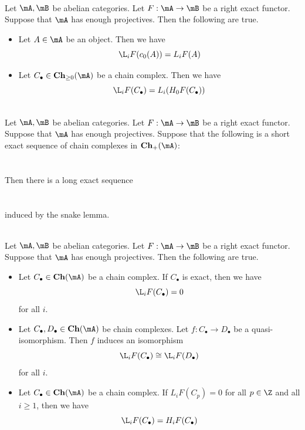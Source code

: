 \documentclass[a4paper]{article}
\begin{document}
\begin{prp}{}{}\\
Let $\mA,\mB$ be abelian categories. Let $F:\mA\to\mB$ be a right exact functor. Suppose that $\mA$ has enough projectives. Then the following are true. 
\begin{itemize}
\item Let $A\in\mA$ be an object. Then we have $$\L_iF(c_0(A))=L_iF(A)$$
\item Let $C_\bullet\in\bold{Ch}_{\geq0}(\mA)$ be a chain complex. Then we have $$\L_iF(C_\bullet)=L_i(H_0F(C_\bullet))$$
\end{itemize}
\end{prp}

\begin{lmm}{}{}\\
Let $\mA,\mB$ be abelian categories. Let $F:\mA\to\mB$ be a right exact functor. Suppose that $\mA$ has enough projectives. Suppose that the following is a short exact sequence of chain complexes in $\bold{Ch}_+(\mA)$: \\~\\
\\
Then there is a long exact sequence \\~\\
\\
induced by the snake lemma. 
\end{lmm}

\begin{crl}{}{}\\
Let $\mA,\mB$ be abelian categories. Let $F:\mA\to\mB$ be a right exact functor. Suppose that $\mA$ has enough projectives. Then the following are true. 
\begin{itemize}
\item Let $C_\bullet\in\bold{Ch}(\mA)$ be a chain complex. If $C_\bullet$ is exact, then we have $$\L_iF(C_\bullet)=0$$ for all $i$. 
\item Let $C_\bullet,D_\bullet\in\bold{Ch}(\mA)$ be chain complexes. Let $f:C_\bullet\to D_\bullet$ be a quasi-isomorphism. Then $f$ induces an isomorphism $$\L_iF(C_\bullet)\cong\L_iF(D_\bullet)$$ for all $i$. 
\item Let $C_\bullet\in\bold{Ch}(\mA)$ be a chain complex. If $L_iF(C_p)=0$ for all $p\in\Z$ and all $i\geq 1$, then we have $$\L_iF(C_\bullet)=H_iF(C_\bullet)$$
\end{itemize}
\end{crl}
\end{document}
